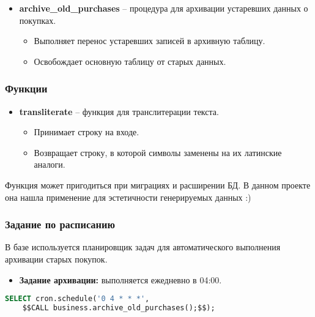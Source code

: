 \begin{itemize}
    \item \textbf{archive\_old\_purchases} – процедура для архивации устаревших данных о покупках.
    \begin{itemize}
        \item Выполняет перенос устаревших записей в архивную таблицу.
        \item Освобождает основную таблицу от старых данных.
    \end{itemize}
\end{itemize}

\subsubsection{Функции}

\begin{itemize}
    \item \textbf{transliterate} – функция для транслитерации текста.
    \begin{itemize}
        \item Принимает строку на входе.
        \item Возвращает строку, в которой символы заменены на их латинские аналоги.
    \end{itemize}
\end{itemize}

Функция может пригодиться при миграциях и расширении БД.
В данном проекте она нашла применение для эстетичности генерируемых данных :)

\subsubsection{Задание по расписанию}

В базе используется планировщик задач для автоматического выполнения архивации старых покупок.

\begin{itemize}
    \item \textbf{Задание архивации:} выполняется ежедневно в 04:00.
\end{itemize}

\begin{lstlisting}[language=SQL, frame=single, keepspaces=true, showstringspaces=false, basicstyle=\normalsize\ttfamily, breaklines=true,label={lst:cronsql}]
SELECT cron.schedule('0 4 * * *',
    $$CALL business.archive_old_purchases();$$);
\end{lstlisting}

